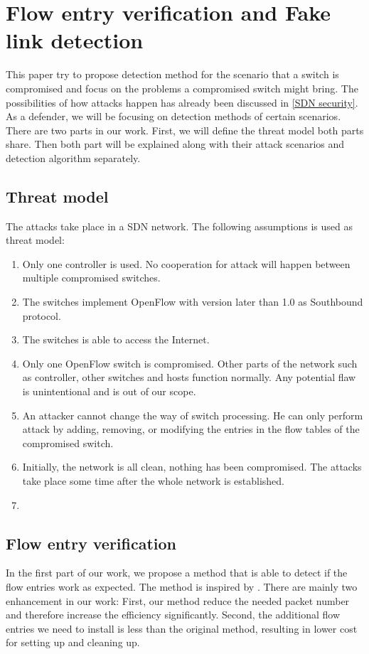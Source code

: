 \chapter{Flow entry verification and Fake link detection}
This paper try to propose detection method for the scenario that a switch is compromised and focus on the problems a compromised switch might bring. The possibilities of how attacks happen has already been discussed in \ref{SDN security}. As a defender, we will be focusing on detection methods of certain scenarios. There are two parts in our work. First, we will define the threat model both parts share. Then both part will be explained along with their attack scenarios and detection algorithm separately.

\section{Threat model}
The attacks take place in a SDN network. The following assumptions is used as threat model:
\begin{enumerate}
\item
Only one controller is used. No cooperation for attack will happen between multiple compromised switches.
\item
The switches implement OpenFlow with version later than 1.0 as Southbound protocol.
\item
The switches is able to access the Internet. 
\item
Only one OpenFlow switch is compromised. Other parts of the network such as controller, other switches and hosts function normally. Any potential flaw is unintentional and is out of our scope.
\item
An attacker cannot change the way of switch processing. He can only perform attack by adding, removing, or modifying the entries in the flow tables of the compromised switch.
\item
Initially, the network is all clean, nothing has been compromised. The attacks take place some time after the whole network is established.
\item 
\end{enumerate}

\section{Flow entry verification}
In the first part of our work, we propose a method that is able to detect if the flow entries work as expected. The method is inspired by \cite{CKGL15}. There are mainly two enhancement in our work: First, our method reduce the needed packet number and therefore increase the efficiency significantly. Second, the additional flow entries we need to install is less than the original method, resulting in lower cost for setting up and cleaning up. 

